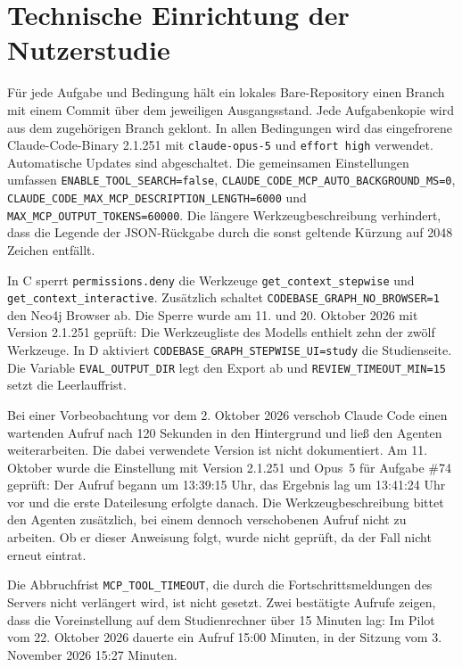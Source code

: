 \chapter{Technische Einrichtung der Nutzerstudie}
\label{app:studientechnik}
\begin{sloppypar}

Für jede Aufgabe und Bedingung hält ein lokales Bare-Repository einen Branch mit einem Commit über dem jeweiligen Ausgangsstand. Jede Aufgabenkopie wird aus dem zugehörigen Branch geklont. In allen Bedingungen wird das eingefrorene Claude-Code-Binary 2.1.251 mit \texttt{claude-opus-5} und \texttt{effort high} verwendet. Automatische Updates sind abgeschaltet. Die gemeinsamen Einstellungen umfassen \texttt{ENABLE\_\allowbreak{}TOOL\_\allowbreak{}SEARCH=false}, \texttt{CLAUDE\_\allowbreak{}CODE\_\allowbreak{}MCP\_\allowbreak{}AUTO\_\allowbreak{}BACKGROUND\_\allowbreak{}MS=0}, \texttt{CLAUDE\_\allowbreak{}CODE\_\allowbreak{}MAX\_\allowbreak{}MCP\_\allowbreak{}DESCRIPTION\_\allowbreak{}LENGTH=6000} und \texttt{MAX\_\allowbreak{}MCP\_\allowbreak{}OUTPUT\_\allowbreak{}TOKENS=60000}. Die längere Werkzeugbeschreibung verhindert, dass die Legende der JSON-Rückgabe durch die sonst geltende Kürzung auf 2048 Zeichen entfällt.

In C sperrt \texttt{permissions.deny} die Werkzeuge \texttt{get\_\allowbreak{}context\_\allowbreak{}stepwise} und \texttt{get\_\allowbreak{}context\_\allowbreak{}interactive}. Zusätzlich schaltet \texttt{CODEBASE\_\allowbreak{}GRAPH\_\allowbreak{}NO\_\allowbreak{}BROWSER=1} den Neo4j Browser ab. Die Sperre wurde am 11. und 20. Oktober 2026 mit Version 2.1.251 geprüft: Die Werkzeugliste des Modells enthielt zehn der zwölf Werkzeuge. In D aktiviert \texttt{CODEBASE\_\allowbreak{}GRAPH\_\allowbreak{}STEPWISE\_\allowbreak{}UI=study} die Studienseite. Die Variable \texttt{EVAL\_\allowbreak{}OUTPUT\_\allowbreak{}DIR} legt den Export ab und \texttt{REVIEW\_\allowbreak{}TIMEOUT\_\allowbreak{}MIN=15} setzt die Leerlauffrist.

Bei einer Vorbeobachtung vor dem 2. Oktober 2026 verschob Claude Code einen wartenden Aufruf nach 120 Sekunden in den Hintergrund und ließ den Agenten weiterarbeiten. Die dabei verwendete Version ist nicht dokumentiert. Am 11. Oktober wurde die Einstellung mit Version 2.1.251 und Opus~5 für Aufgabe \#74 geprüft: Der Aufruf begann um 13:39:15 Uhr, das Ergebnis lag um 13:41:24 Uhr vor und die erste Dateilesung erfolgte danach. Die Werkzeugbeschreibung bittet den Agenten zusätzlich, bei einem dennoch verschobenen Aufruf nicht zu arbeiten. Ob er dieser Anweisung folgt, wurde nicht geprüft, da der Fall nicht erneut eintrat.

Die Abbruchfrist \texttt{MCP\_\allowbreak{}TOOL\_\allowbreak{}TIMEOUT}, die durch die Fortschrittsmeldungen des Servers nicht verlängert wird, ist nicht gesetzt. Zwei bestätigte Aufrufe zeigen, dass die Voreinstellung auf dem Studienrechner über 15 Minuten lag: Im Pilot vom 22. Oktober 2026 dauerte ein Aufruf 15:00 Minuten, in der Sitzung vom 3. November 2026 15:27 Minuten.

\end{sloppypar}

